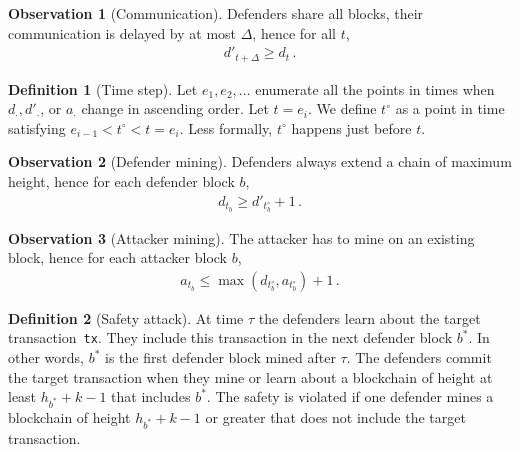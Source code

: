 \documentclass[12pt]{article}
\theoremstyle{definition}
\newtheorem{definition}{Definition}
\newtheorem{observation}{Observation}
\begin{document}
\begin{observation}[Communication] \label{obs:communication}
  Defenders share all blocks, their communication is delayed by at most $\Delta$, hence for all $t$,
  \begin{align}
    d'_{t + \Delta} \geq d_t \,.
  \end{align}
\end{observation}

\newcommand{\justbefore}[1]{{#1^{\circ}}}

\begin{definition}[Time step]
  Let $e_1, e_2, \dots$ enumerate all the points in times when $d_\cdot, d'_\cdot$, or $a_\cdot$ change in ascending order.
  Let $t = e_i$. We define $\justbefore{t}$ as a point in time satisfying $e_{i-1} < \justbefore{t} < t =  e_i$.
  Less formally, $\justbefore{t}$ happens just before $t$.
\end{definition}

\begin{observation}[Defender mining] \label{obs:defendermining}
  Defenders always extend a chain of maximum height, hence for each defender block $b$,
  \begin{align}
    d_{t_b} \geq d'_\justbefore{t_b} + 1\,.
  \end{align}
\end{observation}

\begin{observation}[Attacker mining] \label{obs:attackermining}
  The attacker has to mine on an existing block, hence for each attacker block $b$,
  \begin{align}
    a_{t_b} \leq \max\left(d_\justbefore{t_b}, a_\justbefore{t_{b}}\right) + 1\,.
  \end{align}
\end{observation}

\begin{definition}[Safety attack] \label{def:safety}
  At time $\tau$ the defenders learn about the target transaction~\texttt{tx}.
  They include this transaction in the next defender block $b^*$.
  In other words, $b^*$ is the first defender block mined after $\tau$.
  The defenders commit the target transaction when they mine or learn about a blockchain of height at least $h_{b^*} + k - 1$ that includes $b^*$.
  The safety is violated if one defender mines a blockchain of height $h_{b^*} + k - 1$ or greater that does not include the target transaction.
\end{definition}
\end{document}
